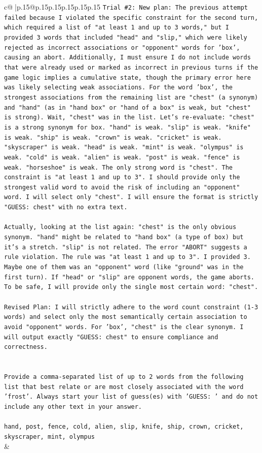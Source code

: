 \documentclass{article}
\begin{document}
{\begin{supertabular}{c@{$\;$}|p{.15\linewidth}@{}p{.15\linewidth}p{.15\linewidth}p{.15\linewidth}p{.15\linewidth}p{.15\linewidth}}
{{{\texttt{Trial \#2: New plan: The previous attempt failed because I violated the specific constraint for the second turn, which required a list of "at least 1 and up to 3 words," but I provided 3 words that included "head" and "slip," which were likely rejected as incorrect associations or "opponent" words for 'box', causing an abort. Additionally, I must ensure I do not include words that were already used or marked as incorrect in previous turns if the game logic implies a cumulative state, though the primary error here was likely selecting weak associations. For the word 'box', the strongest associations from the remaining list are "chest" (a synonym) and "hand" (as in "hand box" or "hand of a box" is weak, but "chest" is strong). Wait, "chest" was in the list. Let's re{-}evaluate: "chest" is a strong synonym for box. "hand" is weak. "slip" is weak. "knife" is weak. "ship" is weak. "crown" is weak. "cricket" is weak. "skyscraper" is weak. "head" is weak. "mint" is weak. "olympus" is weak. "cold" is weak. "alien" is weak. "post" is weak. "fence" is weak. "horseshoe" is weak. The only strong word is "chest". The constraint is "at least 1 and up to 3". I should provide only the strongest valid word to avoid the risk of including an "opponent" word. I will select only "chest". I will ensure the format is strictly "GUESS: chest" with no extra text.} \\
\\ 
\texttt{Actually, looking at the list again: "chest" is the only obvious synonym. "hand" might be related to "hand box" (a type of box) but it's a stretch. "slip" is not related. The error "ABORT" suggests a rule violation. The rule was "at least 1 and up to 3". I provided 3. Maybe one of them was an "opponent" word (like "ground" was in the first turn). If "head" or "slip" are opponent words, the game aborts. To be safe, I will provide only the single most certain word: "chest".} \\
\\ 
\texttt{Revised Plan: I will strictly adhere to the word count constraint (1{-}3 words) and select only the most semantically certain association to avoid "opponent" words. For 'box', "chest" is the clear synonym. I will output exactly "GUESS: chest" to ensure compliance and correctness.} \\
\\ 
\\ 
\texttt{Provide a comma{-}separated list of up to 2 words from the following list that best relate or are most closely associated with the word 'frost'. Always start your list of guess(es) with 'GUESS: ' and do not include any other text in your answer.} \\
\\ 
\texttt{hand, post, fence, cold, alien, slip, knife, ship, crown, cricket, skyscraper, mint, olympus} \\
            }
        }
    }
    & \\ \\


\end{supertabular}}
\end{document}
